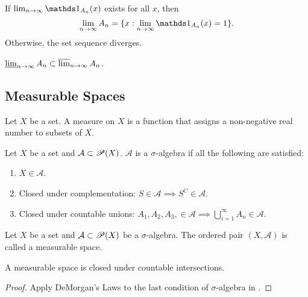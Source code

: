 \documentclass[class=book, crop=false]{standalone}
\begin{document}
        \begin{corollary}
            If $\lim_{n \rightarrow \infty} \indic_{A_n}(x)$ exists for all $x$, then
            \begin{equation*}
                \lim_{n \rightarrow \infty} A_n = \{x : \lim_{n \rightarrow \infty} \indic_{A_n}(x) = 1\}.
            \end{equation*}
            Otherwise, the set sequence diverges.
        \end{corollary}
        
        \begin{theorem}
            $\operatorname{\underline{\lim}}_{n \rightarrow \infty} A_n \subset \operatorname{\overline{\lim}}_{n \rightarrow \infty} A_n$.
        \end{theorem}


        \subsection{Measurable Spaces}
        \begin{definition}[Measure]
            Let $X$ be a set. A measure on $X$ is a function that assigns a non-negative real number to subsets of $X$.
        \end{definition}
        
        \begin{definition} \label{def:sigma-algebra}
            Let $X$ be a set and $\mathcal{A} \subset \mathscr{P}(X)$. $\mathcal{A}$ is a $\sigma$-algebra if all the following are satisfied:
            \begin{enumerate}
                \item $X \in \mathcal{A}$.
                \item Closed under complementation: $S \in \mathcal{A} \implies S^C \in \mathcal{A}$.
                \item Closed under countable unions: $A_1, A_2, A_3, \in \mathcal{A} \implies \bigcup^{\infty}_{i = 1} A_n \in \mathcal{A}$.
            \end{enumerate}
        \end{definition}
        
        \begin{definition}
            Let $X$ be a set and $\mathcal{A} \subset \mathscr{P}(X)$ be a $\sigma$-algebra. The ordered pair $(X, \mathcal{A})$ is called a measurable space.
        \end{definition}
        
        \begin{theorem}
            A measurable space is closed under countable intersections.
        \end{theorem}
        \begin{proof}
            Apply DeMorgan's Laws to the last condition of $\sigma$-algebra in .
        \end{proof}
\end{document}
